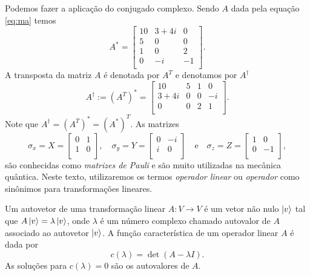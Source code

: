 Podemos fazer a aplicação do conjugado complexo. Sendo $A$ dada pela equação \eqref{eq:ma} temos
%
\begin{equation*}
	A^* = \begin{bmatrix}
		10 & 3+4i &  0 \\
		5  & 0    &  0 \\
		1  & 0    &  2 \\
		0  & -i    & -1 \\
	\end{bmatrix}.
\end{equation*}
%
A transposta da matriz $A$ é denotada por $A^T$ e denotamos por $A^\dagger$
%
\begin{equation*}
	A^\dagger := (A^T)^* = \begin{bmatrix}
		10    &  5 &  1 &  0  \\
		3+4i  &  0 &  0 & -i  \\
		0     &  0 &  2 &  1  \\
	\end{bmatrix}.
\end{equation*}
%
Note que $A^\dagger = (A^T)^* = (A^*)^T$. As matrizes 
\begin{equation}\label{eq:pauli}
\sigma_x = X =\begin{bmatrix}
	0 & 1 \\
	1 & 0 \\
\end{bmatrix}, \quad \sigma_y = Y =\begin{bmatrix}
	0 & -i \\
	i &  0 \\
\end{bmatrix} \quad \text{e} \quad \sigma_z = Z =\begin{bmatrix}
	1 & 0 \\
	0 & -1 \\
\end{bmatrix},
\end{equation}
são conhecidas como \emph{matrizes de Pauli} e são muito utilizadas na mecânica quântica. Neste texto, utilizaremos os termos \emph{operador linear} ou \emph{operador} como sinônimos para transformações lineares.

Um autovetor de uma transformação linear $A: V \to V$ é um vetor não nulo $\ket{v}$ tal que $A\ket{v} = \lambda \ket{v}$, onde $\lambda$ é um número complexo chamado autovalor de $A$ associado ao autovetor $\ket{v}$. A função característica de um operador linear $A$ é dada por
$$
c(\lambda) = \det{(A-\lambda I)}.
$$
As soluções para $c(\lambda) = 0$ são os autovalores de $A$.

